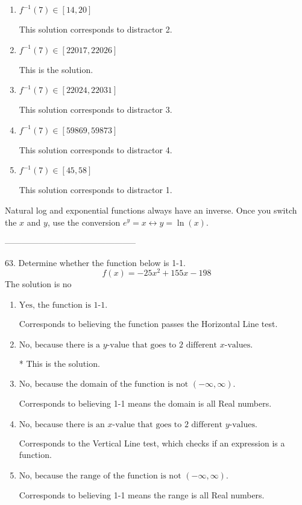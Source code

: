 \documentclass{extbook}[14pt]
\begin{document}
\begin{enumerate}[label=\Alph*.] 
\item $ f^{-1}(7) \in [14, 20] $ 

  This solution corresponds to distractor 2. 
\item $ f^{-1}(7) \in [22017, 22026] $ 

  This is the solution. 
\item $ f^{-1}(7) \in [22024, 22031] $ 

  This solution corresponds to distractor 3. 
\item $ f^{-1}(7) \in [59869, 59873] $ 

  This solution corresponds to distractor 4. 
\item $ f^{-1}(7) \in [45, 58] $ 

  This solution corresponds to distractor 1. 
\end{enumerate} 
 
Natural log and exponential functions always have an inverse. Once you switch the $x$ and $y$, use the conversion $ e^y = x \leftrightarrow y=\ln(x)$.

-----------------------------------------------

63. Determine whether the function below is 1-1.
\[ f(x) = -25 x^2 + 155 x - 198 \] 
The solution is $ \text{no} $ 

\begin{enumerate}[label=\Alph*.] 
\item $ \text{Yes, the function is 1-1.} $ 

 Corresponds to believing the function passes the Horizontal Line test. 
\item $ \text{No, because there is a $y$-value that goes to 2 different $x$-values.} $ 

 * This is the solution. 
\item $ \text{No, because the domain of the function is not $(-\infty, \infty)$.} $ 

 Corresponds to believing 1-1 means the domain is all Real numbers. 
\item $ \text{No, because there is an $x$-value that goes to 2 different $y$-values.} $ 

 Corresponds to the Vertical Line test, which checks if an expression is a function. 
\item $ \text{No, because the range of the function is not $(-\infty, \infty)$.} $ 

 Corresponds to believing 1-1 means the range is all Real numbers. 
\end{enumerate} 
 
\end{document}
